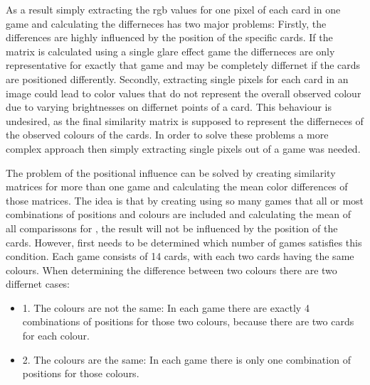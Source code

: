 As a result simply extracting the rgb values for one pixel of each card in one game and calculating the differneces has two major problems: Firstly, the differences are highly influenced by the position of the specific cards. If the matrix is calculated using a single glare effect game the differneces are only representative for exactly that game and may be completely differnet if the cards are positioned differently. Secondly, extracting single pixels for each card in an image could lead to color values that do not represent the overall observed colour due to varying brightnesses on differnet points of a card. This behaviour is undesired, as the final similarity matrix is supposed to represent the differneces of the observed colours of the cards.  In order to solve these problems a more complex approach then simply extracting single pixels out of a game was needed. 

The problem of the positional influence can be solved by creating similarity matrices for more than one game and calculating the mean color differences of those matrices. The idea is that by creating using so many games that all or most combinations of positions and colours are included and calculating the mean of all comparissons for , the result will not be influenced by the position of the cards.  However, first needs to be determined which number of games satisfies this condition. Each game consists of 14 cards, with each two cards having the same colours. When determining the difference between two colours there are two differnet cases: 
\begin{itemize}
	\item 1. The colours are not the same: In each game there are exactly 4 combinations of positions for those two colours, because there are two cards for each colour. 
	\item 2. The colours are the same: In each game there is only one combination of positions for those colours.  
\end{itemize}

